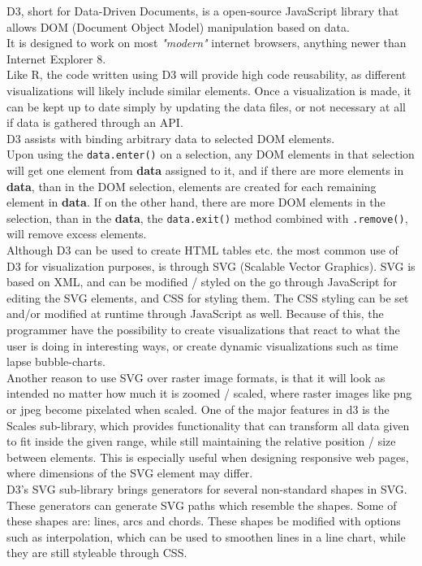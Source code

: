 \documentclass[Report.tex]{subfiles}
\begin{document}
	D3, short for Data-Driven Documents, is a open-source JavaScript library that allows DOM (Document Object Model) manipulation based on data.\\
	It is designed to work on most \textit{"modern"} internet browsers, anything newer than Internet Explorer 8.\\
	
	Like R, the code written using D3 will provide high code reusability, as different visualizations will likely include similar elements. Once a visualization is made, it can be kept up to date simply by updating the data files, or not necessary at all if data is gathered through an API.\\ 
	D3 assists with binding arbitrary data to selected DOM elements.\\ Upon using the \texttt{data.enter()} on a selection, any DOM elements in that selection will get one element from \textbf{data} assigned to it, and if there are more elements in \textbf{data}, than in the DOM selection, elements are created for each remaining element in \textbf{data}. If on the other hand, there are more DOM elements in the selection, than in the \textbf{data}, the \texttt{data.exit()} method combined with \texttt{.remove()}, will remove excess elements.\cite{D3}\\
	Although D3 can be used to create HTML tables etc. the most common use of D3 for visualization purposes, is through SVG (Scalable Vector Graphics).
	SVG is based on XML, and can be modified / styled on the go through JavaScript for editing the SVG elements, and CSS for styling them. The CSS styling can be set and/or modified at runtime through JavaScript as well. Because of this, the programmer have the possibility to create visualizations that react to what the user is doing in interesting ways, or create dynamic visualizations such as time lapse bubble-charts.\\
	Another reason to use SVG over raster image formats, is that it will look as intended no matter how much it is zoomed / scaled, where raster images like png or jpeg become pixelated when scaled.
	One of the major features in d3 is the Scales sub-library, which provides functionality that can transform all data given to fit inside the given range, while still maintaining the relative position / size between elements.
	This is especially useful when designing responsive web pages, where dimensions of the SVG element may differ.\\
	D3's SVG sub-library brings generators for several non-standard shapes in SVG. These generators can generate SVG paths which resemble the shapes. Some of these shapes are: lines, arcs and chords. These shapes be modified with options such as interpolation, which can be used to smoothen lines in a line chart, while they are still styleable through CSS.\\
	
\end{document}
